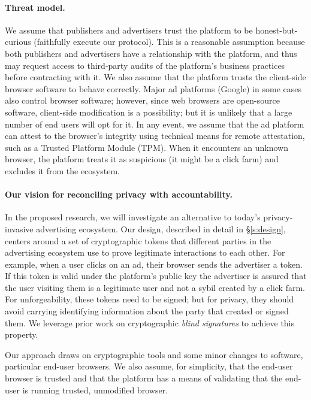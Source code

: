 \paragraph{Threat model.}
%
We assume that publishers and advertisers trust the platform to be honest-but-curious (\ie faithfully execute our protocol). 
%
This is a reasonable assumption because both publishers and advertisers have a relationship with the platform, and thus may request access to third-party audits of the platform's business practices before contracting with it.  
%
We also assume that the platform trusts the client-side browser software to behave correctly.
%
Major ad platforms (\eg Google) in some cases also control browser software; however, since web browsers are open-source software, client-side modification is a possibility; but it is unlikely that a large number of end users will opt for it.
%
In any event, we assume that the ad platform can attest to the browser's integrity using technical means for remote attestation, such as a Trusted Platform Module (TPM).
%
When it encounters an unknown browser, the platform treats it as suspicious (\ie it might be a click farm) and excludes it from the ecosystem.
%

\paragraph{Our vision for reconciling privacy with accountability.}
%
In the proposed research, we will investigate an alternative to today's privacy-invasive
advertising ecosystem.
%
Our design, described in detail in \S\ref{s:design}, centers around a set of cryptographic tokens that different parties in the advertising ecosystem use to prove legitimate interactions to each other.
%
For example, when a user clicks on an ad, their browser sends the advertiser a token.  If this token is valid under the platform's public key the advertiser is assured that the user visiting them is a legitimate user and not a sybil created by a click farm.
%
For unforgeability, these tokens need to be signed; but for privacy, they should avoid carrying identifying information about the party that created or signed them.
%
We leverage prior work on cryptographic \emph{blind signatures} to achieve this property.
%

%
Our approach draws on cryptographic tools and some minor changes to software, particular end-user browsers.
%
We also assume, for simplicity, that the end-user browser is trusted and that the platform has a means of validating that the end-user is running trusted, unmodified browser.
%

